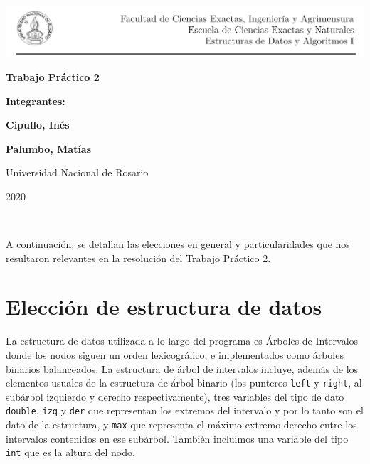 \documentclass[11pt]{article}
\begin{document}
\begin{titlepage}
    \hspace{-1.2cm}\includegraphics[scale= 0.8]{header2}
    \begin{center}
        \vfill
        \vfill
            \vspace{0.7cm}
            \noindent\textbf{\Huge Trabajo Práctico 2}\par
            \vspace{.5cm}
        \vfill
        \noindent \textbf{\huge Integrantes:}\par
        \vspace{.5cm}
        \noindent \textbf{\Large Cipullo, Inés}\par
        \noindent \textbf{\Large Palumbo, Matías}\par
 
        \vfill
        \large Universidad Nacional de Rosario \par
        \noindent\large 2020
    \end{center}
 \end{titlepage}
 \ \par


\noindent A continuación, se detallan las elecciones en general y particularidades que nos resultaron relevantes en la resolución del Trabajo Práctico 2.\par


\section{Elección de estructura de datos}

La estructura de datos utilizada a lo largo del programa es Árboles de Intervalos donde los nodos siguen un orden lexicográfico, e implementados como árboles binarios balanceados.
La estructura de árbol de intervalos incluye, además de los elementos usuales de la estructura de árbol binario (los punteros \verb|left| y \verb|right|, al subárbol izquierdo y derecho respectivamente), 
tres variables del tipo de dato \verb|double|, \verb|izq| y \verb|der| que representan los extremos del intervalo y por lo tanto son el dato de la estructura, y \verb|max| que representa el máximo extremo derecho entre los intervalos contenidos en ese subárbol.
También incluimos una variable del tipo \verb|int| que es la altura del nodo. \par
\end{document}
